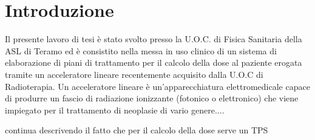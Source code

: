 \chapter*{Introduzione} 
Il presente lavoro di tesi è stato svolto presso la U.O.C. di Fisica Sanitaria della ASL di Teramo ed è consistito nella messa in uso clinico di un sistema di elaborazione di piani di trattamento per il calcolo della dose al paziente erogata tramite un acceleratore lineare recentemente acquisito dalla U.O.C di Radioterapia. Un acceleratore lineare è un'apparecchiatura elettromedicale capace di produrre un fascio di radiazione ionizzante (fotonico o elettronico) che viene impiegato per il trattamento di neoplasie di vario genere....


continua descrivendo il fatto che per il calcolo della dose serve un TPS